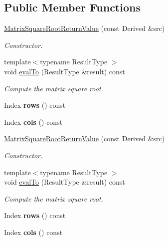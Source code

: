 \subsection*{Public Member Functions}
\begin{DoxyCompactItemize}
\item 
\hyperlink{class_eigen_1_1_matrix_square_root_return_value_aa27fd0e59ff1711a55ee8a4342c035d5}{Matrix\+Square\+Root\+Return\+Value} (const Derived \&src)
\begin{DoxyCompactList}\small\item\em Constructor. \end{DoxyCompactList}\item 
{\footnotesize template$<$typename Result\+Type $>$ }\\void \hyperlink{class_eigen_1_1_matrix_square_root_return_value_a97577165569edcf19429c7748b670e51}{eval\+To} (Result\+Type \&result) const
\begin{DoxyCompactList}\small\item\em Compute the matrix square root. \end{DoxyCompactList}\item 
\mbox{\label{class_eigen_1_1_matrix_square_root_return_value_acce9ceba3f09267b60e74387f22ce32b}} 
Index {\bfseries rows} () const
\item 
\mbox{\label{class_eigen_1_1_matrix_square_root_return_value_a73bb61302e13bbc69000d6a93abf384d}} 
Index {\bfseries cols} () const
\item 
\hyperlink{class_eigen_1_1_matrix_square_root_return_value_aa27fd0e59ff1711a55ee8a4342c035d5}{Matrix\+Square\+Root\+Return\+Value} (const Derived \&src)
\begin{DoxyCompactList}\small\item\em Constructor. \end{DoxyCompactList}\item 
{\footnotesize template$<$typename Result\+Type $>$ }\\void \hyperlink{class_eigen_1_1_matrix_square_root_return_value_a97577165569edcf19429c7748b670e51}{eval\+To} (Result\+Type \&result) const
\begin{DoxyCompactList}\small\item\em Compute the matrix square root. \end{DoxyCompactList}\item 
\mbox{\label{class_eigen_1_1_matrix_square_root_return_value_acce9ceba3f09267b60e74387f22ce32b}} 
Index {\bfseries rows} () const
\item 
\mbox{\label{class_eigen_1_1_matrix_square_root_return_value_a73bb61302e13bbc69000d6a93abf384d}} 
Index {\bfseries cols} () const
\end{DoxyCompactItemize}
